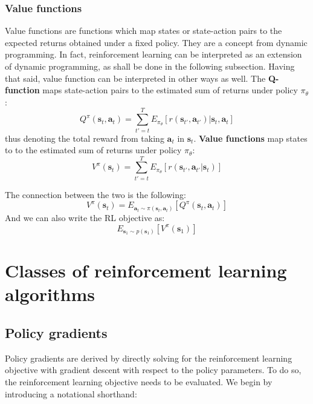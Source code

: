 \subsubsection{Value functions}
Value functions are functions which map states or state-action pairs
to the expected returns obtained under a fixed policy.
They are a concept from dynamic programming. In fact,
reinforcement learning can be interpreted as an extension of dynamic programming,
as shall be done in the following subsection.
Having that said, value function can be interpreted in other ways as well.
The \textbf{Q-function} maps state-action pairs to the estimated sum of returns
under policy $ \pi_{ \theta } $:
\begin{equation}
		\label{eq:q-function}
		Q^\pi (\bm{s}_t, \bm{a}_t) = \sum_{t'=t}^{T} E_{\pi_\theta}
		\left[ r(\bm{s}_{t'}, \bm{a}_{t'} )| \bm{s}_t, \bm{a}_t \right] 
\end{equation}
thus denoting the total reward from taking $\bm{a}_t$ in $\bm{s}_t$.
\textbf{Value functions} map states to to the estimated sum of returns
under policy $ \pi_{ \theta } $:
\begin{equation}
		\label{eq:value-function}
		V^\pi (\bm{s}_t) = \sum_{t'=t}^{T} E_{\pi_\theta}
		\left[ r(\bm{s}_{t'}, \bm{a}_{t'} | \bm{s}_t) \right] 
\end{equation}

The connection between the two is the following:
\begin{equation}
		V^\pi (\bm{s}_t) = E_{\bm{a}_t \sim \pi(\bm{s}_t, \bm{a}_t)}
		\left[ Q^\pi(\bm{s}_t, \bm{a}_t) \right] 
\end{equation}
And we can also write the RL objective as:
\begin{equation}
		E_{\bm{s}_1 \sim p(\bm{s}_1)}
		\left[ V^\pi (\bm{s}_1) \right] 
\end{equation}


\section{Classes of reinforcement learning algorithms}
\subsection{Policy gradients}
Policy gradients are derived by directly solving for
the reinforcement learning objective with gradient descent
with respect to the policy parameters.
To do so, the reinforcement learning objective needs to be evaluated.
We begin by introducing a notational shorthand:

